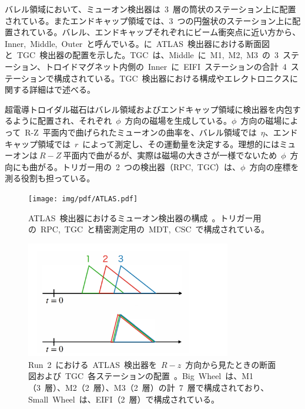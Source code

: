 バレル領域において、ミューオン検出器は~3~層の筒状のステーション上に配置されている。またエンドキャップ領域では、3~つの円盤状のステーション上に配置されている。バレル、エンドキャップそれぞれにビーム衝突点に近い方から、Inner,~Middle,~Outer~と呼んでいる。に~ATLAS~検出器における断面図と~TGC~検出器の配置を示した。TGC~は、Middle~に~M1,~M2,~M3~の~3~ステーション、トロイドマグネット内側の~Inner~に~EIFI~ステーションの合計~4~ステーションで構成されている。TGC~検出器における構成やエレクトロニクスに関する詳細はで述べる。

超電導トロイダル磁石はバレル領域およびエンドキャップ領域に検出器を内包するように配置され、それぞれ~$\phi$~方向の磁場を生成している。$\phi$~方向の磁場によって~R-Z~平面内で曲げられたミューオンの曲率を、バレル領域では~$\eta$、エンドキャップ領域では~$r$~によって測定し、その運動量を決定する。理想的にはミューオンは$~R-Z~$平面内で曲がるが、実際は磁場の大きさが一様でないため~$\phi$~方向にも曲がる。トリガー用の~2~つの検出器（RPC,~TGC）は、$\phi$~方向の座標を測る役割も担っている。

\begin{figure}[H]
        \centering   
        \texttt{[image: img/pdf/ATLAS.pdf]}
        \caption[ATLAS~検出器におけるミューオン検出器の構成]{ATLAS~検出器におけるミューオン検出器の構成~\cite{TR:01}。トリガー用の~RPC,~TGC~と精密測定用の~MDT,~CSC~で構成されている。}\label{fig:mud}
\end{figure}

\begin{figure}[H]
    \centering
    \includegraphics[width=0.8\textwidth,page=7]{img/slide/slide.pdf}
    \caption[Run~2~における~ATLAS~検出器を~$R-z$~方向から見たときの断面図および~TGC~各ステーションの配置]{Run~2~における~ATLAS~検出器を~$R-z$~方向から見たときの断面図および~TGC~各ステーションの配置~\cite{TR:01}。Big~Wheel~は、M1（3~層）、M2（2~層）、M3（2~層）の計~7~層で構成されており、Small~Wheel~は、EIFI（2~層）で構成されている。}\label{fig:tgc000}
\end{figure}

